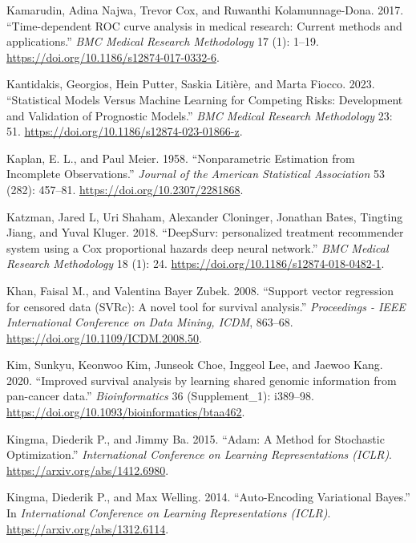 \documentclass[
  letterpaper,
  krantz2]{style/krantz}
\newlength{\cslhangindent}
\newenvironment{CSLReferences}[2] %
 {\begin{list}{}{%
  \setlength{\itemindent}{0pt}
  \setlength{\leftmargin}{0pt}
  \setlength{\parsep}{0pt}
  \ifodd #1
   \setlength{\leftmargin}{\cslhangindent}
   \setlength{\itemindent}{-1\cslhangindent}
  \fi
  \setlength{\itemsep}{#2\baselineskip}}}
 {\end{list}}
\begin{document}
\begin{CSLReferences}{1}{0}
Kamarudin, Adina Najwa, Trevor Cox, and Ruwanthi Kolamunnage-Dona. 2017.
{``{Time-dependent ROC curve analysis in medical research: Current
methods and applications}.''} \emph{BMC Medical Research Methodology} 17
(1): 1--19. \url{https://doi.org/10.1186/s12874-017-0332-6}.

Kantidakis, Georgios, Hein Putter, Saskia Litière, and Marta Fiocco.
2023. {``Statistical Models Versus Machine Learning for Competing Risks:
Development and Validation of Prognostic Models.''} \emph{BMC Medical
Research Methodology} 23: 51.
\url{https://doi.org/10.1186/s12874-023-01866-z}.

Kaplan, E. L., and Paul Meier. 1958. {``{Nonparametric Estimation from
Incomplete Observations}.''} \emph{Journal of the American Statistical
Association} 53 (282): 457--81. \url{https://doi.org/10.2307/2281868}.

Katzman, Jared L, Uri Shaham, Alexander Cloninger, Jonathan Bates,
Tingting Jiang, and Yuval Kluger. 2018. {``{DeepSurv: personalized
treatment recommender system using a Cox proportional hazards deep
neural network}.''} \emph{BMC Medical Research Methodology} 18 (1): 24.
\url{https://doi.org/10.1186/s12874-018-0482-1}.

Khan, Faisal M., and Valentina Bayer Zubek. 2008. {``{Support vector
regression for censored data (SVRc): A novel tool for survival
analysis}.''} \emph{Proceedings - IEEE International Conference on Data
Mining, ICDM}, 863--68. \url{https://doi.org/10.1109/ICDM.2008.50}.

Kim, Sunkyu, Keonwoo Kim, Junseok Choe, Inggeol Lee, and Jaewoo Kang.
2020. {``{Improved survival analysis by learning shared genomic
information from pan-cancer data}.''} \emph{Bioinformatics} 36
(Supplement\_1): i389--98.
\url{https://doi.org/10.1093/bioinformatics/btaa462}.

Kingma, Diederik P., and Jimmy Ba. 2015. {``{Adam: A Method for
Stochastic Optimization}.''} \emph{International Conference on Learning
Representations (ICLR)}. \url{https://arxiv.org/abs/1412.6980}.

Kingma, Diederik P., and Max Welling. 2014. {``{Auto-Encoding
Variational Bayes}.''} In \emph{International Conference on Learning
Representations (ICLR)}. \url{https://arxiv.org/abs/1312.6114}.


\end{CSLReferences}
\end{document}

